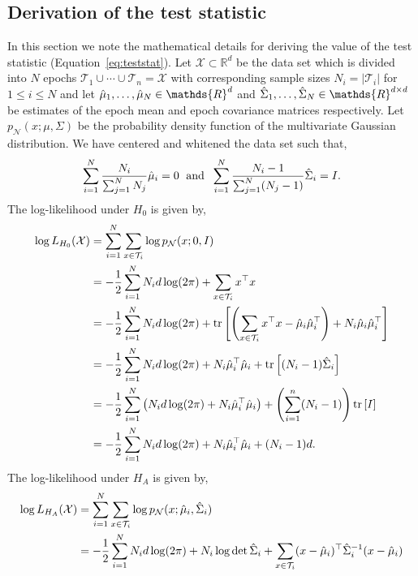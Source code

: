 \documentclass{article}
\newcommand{\R}{\ensuremath{\mathds{R}}}
\newcommand{\1}{\ensuremath{\mathds{1}}}
\newcommand{\0}{\ensuremath{0}}
\DeclareMathOperator*{\trace}{tr}
\begin{document}
\begin{appendices}
\subsection{Derivation of the test statistic}

In this section we note the mathematical details for deriving the value of the test statistic (Equation~\ref{eq:teststat}). 
Let $\mathcal{X} \subset \R^{d}$ be the data set which is divided into $N$ epochs 
$\mathcal{T}_1 \cup \cdots \cup \mathcal{T}_n = \mathcal{X}$ with corresponding sample 
sizes $N_i = | \mathcal{T}_i |$ for $1 \leq i \leq N$ and let $\emu_1, \ldots, \emu_N \in \R^d$  
and $\esi_1, \ldots, \esi_N \in \R^{d \times d}$ be estimates of the epoch mean and epoch covariance matrices 
respectively. Let $p_{\mathcal{N}}(x ; \mu, \Sigma)$ be the probability density function of the 
multivariate Gaussian distribution. We have centered and whitened the data set such that,
\begin{align*}
	\sum_{i=1}^N \frac{N_i}{\sum_{j=1}^N N_j} \hat{\mu}_i = 0 \; \text{ and } \; \sum_{i=1}^N \frac{N_i-1}{\sum_{j=1}^N (N_j -1)} \hat{\Sigma}_i = I . 
\end{align*}
The log-likelihood under $H_0$ is given by, 
\begin{align*}
	\log L_{H_0}(\mathcal{X}) & = \sum_{i=1}^N \sum_{x \in \mathcal{T}_i} \log p_{\mathcal{N}}(x ; 0, I) \\
 & = -\frac{1}{2} \sum_{i=1}^N N_i d \log (2\pi) + \sum_{x \in \mathcal{T}_i} x^\top x \\
 &  = -\frac{1}{2} \sum_{i=1}^N N_i d \log (2\pi) + \trace \left[  \left( \sum_{x \in \mathcal{T}_i} x^\top x - \emu_i \emu^\top_i  \right)+ N_i \emu_i \emu^\top_i \right] \\
 & =  -\frac{1}{2} \sum_{i=1}^N N_i d \log (2\pi) + N_i \emu^\top_i \emu_i  + \trace \left[ (N_i-1) \esi_i \right] \\
 & =  -\frac{1}{2} \sum_{i=1}^N \left( N_i d \log (2\pi) + N_i \emu^\top_i \emu_i \right) + \left(\sum_{i=1}^n (N_i - 1)\right)  \trace\left[ I \right] \\
 & =  -\frac{1}{2} \sum_{i=1}^N  N_i d \log (2\pi) + N_i \emu^\top_i \emu_i + (N_i - 1) d . 
\end{align*}
The log-likelihood under $H_A$ is given by, 
\begin{align*} 
	\log L_{H_A}(\mathcal{X}) & = \sum_{i=1}^N \sum_{x \in \mathcal{T}_i} \log p_{\mathcal{N}}(x ; \emu_i, \esi_i) \\
& = -\frac{1}{2} \sum_{i=1}^N N_i d \log (2\pi)  + N_i \log \det \esi_i + \sum_{x \in \mathcal{T}_i} (x-\emu_i)^\top \esi_i^{-1} (x-\emu_i) \\

\end{align*}
\end{appendices}
\end{document}
